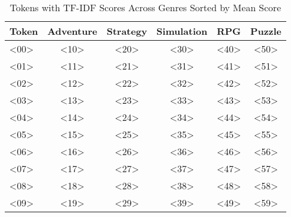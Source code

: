\begin{table}[h]
    \centering
    \begin{tabular}{l|c|c|c|c|c}
        Token & Adventure & Strategy & Simulation & RPG & Puzzle \\
        \hline
        <00> & <10> & <20> & <30> & <40> & <50> \\
        <01> & <11> & <21> & <31> & <41> & <51> \\
        <02> & <12> & <22> & <32> & <42> & <52> \\
        <03> & <13> & <23> & <33> & <43> & <53> \\
        <04> & <14> & <24> & <34> & <44> & <54> \\
        <05> & <15> & <25> & <35> & <45> & <55> \\
        <06> & <16> & <26> & <36> & <46> & <56> \\
        <07> & <17> & <27> & <37> & <47> & <57> \\
        <08> & <18> & <28> & <38> & <48> & <58> \\
        <09> & <19> & <29> & <39> & <49> & <59>
    \end{tabular}
    \caption{Tokens with TF-IDF Scores Across Genres Sorted by Mean Score}
    \label{tab:prominent_tokens}
\end{table}